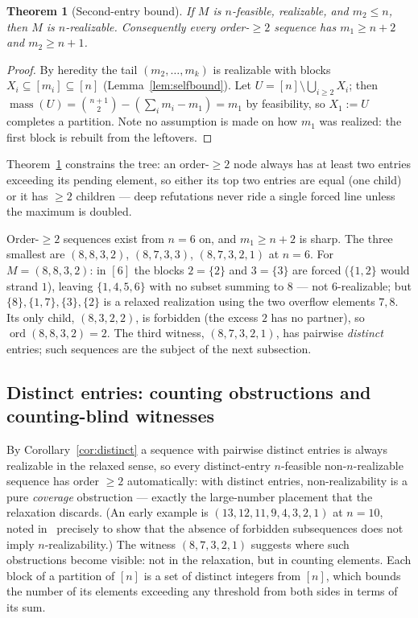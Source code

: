 \documentclass[11pt]{article}
\newtheorem{theorem}{Theorem}[section]
\theoremstyle{definition}
\theoremstyle{remark}
\newcommand{\mass}{\operatorname{mass}}
\newcommand{\ord}{\operatorname{ord}}
\newcommand{\intv}[1]{[#1]}
\begin{document}
\begin{theorem}[Second-entry bound]\label{thm:secondentry}
If $M$ is $n$-feasible, realizable, and $m_2\le n$, then $M$ is $n$-realizable.
Consequently every order-$\ge2$ sequence has $m_1\ge n+2$ \emph{and} $m_2\ge n+1$.
\end{theorem}

\begin{proof}
By heredity the tail $(m_2,\dots,m_k)$ is realizable with blocks
$X_i\subseteq\intv{m_i}\subseteq\intv n$ (Lemma~\ref{lem:selfbound}). Let
$U=\intv n\setminus\bigcup_{i\ge2}X_i$; then
$\mass(U)=\binom{n+1}{2}-(\sum_im_i-m_1)=m_1$ by feasibility, so $X_1:=U$ completes
a partition. Note no assumption is made on how $m_1$ was realized: the first block
is rebuilt from the leftovers.
\end{proof}

Theorem~\ref{thm:secondentry} constrains the tree: an order-$\ge2$ node always has
at least two entries exceeding its pending element, so either its top two entries
are equal (one child) or it has $\ge2$ children --- deep refutations never ride a
single forced line unless the maximum is doubled.

Order-$\ge2$ sequences exist from $n=6$ on, and $m_1\ge n+2$ is sharp. The three
smallest are $(8,8,3,2)$, $(8,7,3,3)$, $(8,7,3,2,1)$ at $n=6$. For $M=(8,8,3,2)$: in
$\intv6$ the blocks $2=\{2\}$ and $3=\{3\}$ are forced ($\{1,2\}$ would strand
$1$), leaving $\{1,4,5,6\}$ with no subset summing to $8$ --- not $6$-realizable;
but $\{8\},\{1,7\},\{3\},\{2\}$ is a relaxed realization using the two overflow
elements $7,8$. Its only child, $(8,3,2,2)$, is forbidden (the excess $2$ has no
partner), so $\ord(8,8,3,2)=2$. The third witness, $(8,7,3,2,1)$, has pairwise
\emph{distinct} entries; such sequences are the subject of the next subsection.

\subsection{Distinct entries: counting obstructions and counting-blind
witnesses}\label{subsec:distinct}

By Corollary~\ref{cor:distinct} a sequence with pairwise distinct entries is always
realizable in the relaxed sense, so every distinct-entry $n$-feasible
non-$n$-realizable sequence has order $\ge2$ automatically: with distinct entries,
non-realizability is a pure \emph{coverage} obstruction --- exactly the large-number
placement that the relaxation discards. (An early example is $(13,12,11,9,4,3,2,1)$
at $n=10$, noted in~\cite[Example~4.1]{Moragas10} precisely to show that the absence
of forbidden subsequences does not imply $n$-realizability.) The witness
$(8,7,3,2,1)$ suggests where such obstructions become visible: not in the
relaxation, but in counting elements. Each block of a partition of $\intv n$ is a
set of distinct integers from $\intv n$, which bounds the number of its elements
exceeding any threshold from both sides in terms of its sum.
\end{document}
